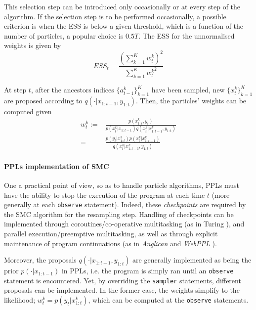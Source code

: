This selection step can be introduced only occasionally or at every step of the algorithm.
If the selection step is to be performed occasionally, a possible criterion is when the \gls{ESS} is below a given threshold, which is a function of the number of particles, a popular choice is $0.5T$. The \gls{ESS} for the unnormalised weights is given by
$$ ESS_t = \frac{{\left( \sum_{k=1}^K{w_t^k} \right)}^2}{\sum_{k=1}^K{{w_t^k}^2}}$$

At step $t$, after the ancestors indices $\{a^k_{t-1}\}_{k=1}^K$ have been sampled, new $\{x_{t}^k\}_{k=1}^K$ are proposed according to $q(\cdot|x_{1:t-1},y_{1:t})$. Then, the particles' weights can be computed given
\begin{equation*} \label{eq:SMC_weights}
\begin{aligned}
w_{t}^k :=& \frac{p(x^k_{1:t},y_{t})}{p(x^k_{t}|x_{1:t-1}) q(x^k_{t}|x^k_{1:t-1},y_{1:t})}\\
=& \frac{p(y_{t}|x^k_{1:t})p(x^k_{t}|x^k_{1:t-1})}{q(x^k_{t}|x^k_{1:t-1},y_{1:t})}
\end{aligned}
\end{equation*}

\paragraph{\glspl{PPL} implementation of \gls{SMC}}

One a practical point of view, so as to handle particle algorithms, \glspl{PPL} must have the ability to stop the execution of the program at each time $t$ (more generally at each \texttt{observe} statement). Indeed, these \textit{chechpoints} are required by the \gls{SMC} algorithm for the resampling step.
Handling of checkpoints can be implemented through coroutines/co-operative multitasking (as in Turing \cite{Turing}), and parallel execution/preemptive multitasking, as well as through explicit maintenance of program continuations (as in \emph{Anglican} \cite{wood-aistats-2014} and \emph{WebPPL} \cite{dippl}).

Moreover, the proposals $q(\cdot|x_{1:t-1},y_{1:t})$ are generally implemented as being the prior $p(\cdot|x_{1:t-1})$ in \glspl{PPL}, i.e. the program is simply ran until an \texttt{observe} statement is encountered. Yet, by overriding the \texttt{sampler} statements, different proposals can be implemented. In the former case, the weights simplify to the likelihood; $w_{t}^k = p(y_{t}|x^k_{1:t})$, which can be computed at the \texttt{observe} statements. 


